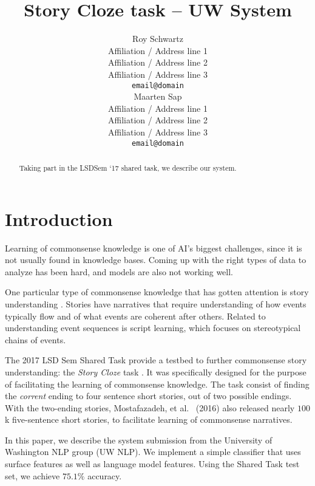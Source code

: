 \documentclass[11pt]{article}
\title{Story Cloze task -- UW System}
\author{Roy Schwartz\\
  Affiliation / Address line 1 \\
  Affiliation / Address line 2 \\
  Affiliation / Address line 3 \\
  {\tt email@domain} \\\And	
  Maarten Sap \\
  Affiliation / Address line 1 \\
  Affiliation / Address line 2 \\
  Affiliation / Address line 3 \\
  {\tt email@domain} \\}
\date{}
\begin{document}
\maketitle
\begin{abstract}
Taking part in the LSDSem `17 shared task, we describe our system.

\end{abstract}

\section{Introduction}

Learning of commonsense knowledge is one of AI's biggest challenges, since it is not usually found in knowledge bases.
Coming up with the right types of data to analyze has been hard, and models are also not working well.

One particular type of commonsense knowledge that has gotten attention is story understanding \cite{??}. Stories have narratives that require understanding of how events typically flow and of what events are coherent after others.
Related to understanding event sequences is script learning, which focuses on stereotypical chains of events.

The 2017 LSD Sem Shared Task provide a testbed to further commonsense story understanding: the \textit{Story Cloze} task \cite{Mostafazadeh:2016}. It was specifically designed for the purpose of facilitating the learning of commonsense knowledge. The task consist of finding the \textit{corrent} ending to four sentence short stories, out of two possible endings. 
With the two-ending stories, Mostafazadeh, et al. ~(2016)\nocite{Mostafazadeh:2016} also released nearly $100$k five-sentence short stories, to facilitate learning of commonsense narratives.

In this paper, we describe the system submission from the University of Washington NLP group (UW NLP).
We implement a simple classifier that uses surface features as well as language model features. Using the Shared Task test set, we achieve $75.1\%$ accuracy.
\end{document}

